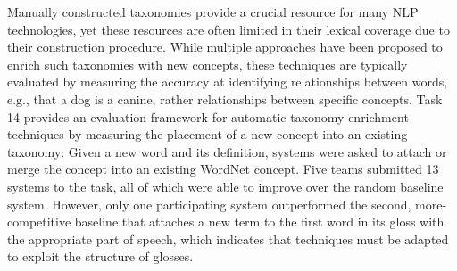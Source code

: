 Manually constructed taxonomies provide a crucial resource for many NLP technologies, yet these resources are often limited in their lexical coverage due to their construction procedure. While multiple approaches have been proposed to enrich such taxonomies with new concepts, these techniques are typically evaluated by measuring the accuracy at identifying relationships between words, e.g., that a dog is a canine, rather relationships between specific concepts. Task 14 provides an evaluation framework for automatic taxonomy enrichment techniques by measuring the placement of a new concept into an existing taxonomy: Given a new word and its definition, systems were asked to attach or merge the concept into an existing WordNet concept. Five teams submitted 13 systems to the task, all of which were able to improve over the random baseline system. However, only one participating system outperformed the second, more-competitive baseline that attaches a new term to the first word in its gloss with the appropriate part of speech, which indicates that techniques must be adapted to exploit the structure of glosses.
